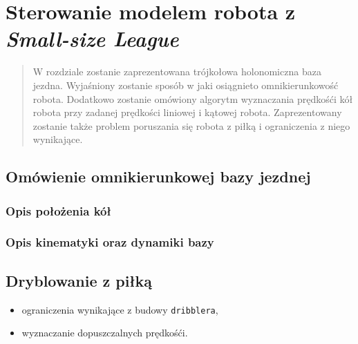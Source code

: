 \chapter{Sterowanie modelem robota z \emph{Small-size League} }

\begin{abstract}
W rozdziale zostanie zaprezentowana trójkołowa holonomiczna baza jezdna. Wyjaśniony zostanie sposób w jaki osiągnieto omnikierunkowość robota.
Dodatkowo zostanie omówiony algorytm wyznaczania prędkośći kół robota przy zadanej prędkości liniowej i kątowej robota.
Zaprezentowany zostanie także problem poruszania się robota z piłką i ograniczenia z niego wynikające.
\end{abstract}


	\section{Omówienie omnikierunkowej bazy jezdnej}
		\subsection{Opis położenia kół}
		\subsection{Opis kinematyki oraz dynamiki bazy}


	\section{Dryblowanie z piłką}
	\begin{itemize}
	 \item ograniczenia wynikające z budowy \texttt{dribblera},
	 \item wyznaczanie dopuszczalnych prędkośći.
	\end{itemize}

